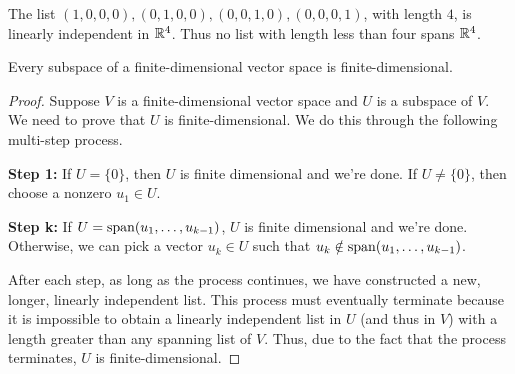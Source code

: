 \begin{example}
    The list $(1,0,0,0),(0,1,0,0),(0,0,1,0),(0,0,0,1)$, with length $4$, is linearly independent in $\mathbb{R}^4$. Thus no list with length less than four spans $\mathbb{R}^4$.
\end{example}
\begin{theorem}
    Every subspace of a finite-dimensional vector space is finite-dimensional.
\end{theorem}
\begin{proof}
    Suppose $V$ is a finite-dimensional vector space and $U$ is a subspace of $V$. We need to prove that $U$ is finite-dimensional. We do this through the following multi-step process.

    \textbf{Step 1:} If $U = \{0\}$, then $U$ is finite dimensional and we're done. If $U \ne \{0\}$, then choose a nonzero $u_1 \in U$.

    \textbf{Step k:} If $U = \operatorname{span}(u_1, \dots, u_{k-1})$, $U$ is finite dimensional and we're done. Otherwise, we can pick a vector $u_k\in U$ such that $u_k\notin\operatorname{span}(u_1, \dots, u_{k-1})$. 
    
    After each step, as long as the process continues, we have constructed a new, longer, linearly independent list. This process must eventually terminate because it is impossible to obtain a linearly independent list in $U$ (and thus in $V$) with a length greater than any spanning list of $V$. Thus, due to the fact that the process terminates, $U$ is finite-dimensional.
\end{proof}
